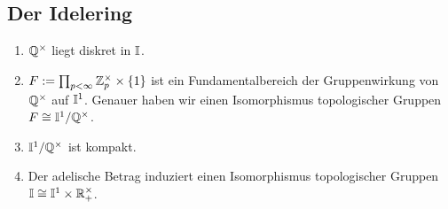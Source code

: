 \subsection{Der Idelering}
		\begin{satz}
			\begin{enumerate}[label=\emph{(\alph*)}]
				\item $\mathbb{Q}^\times$ liegt diskret in $\mathbb{I}$.
				\item $F:=\prod_{p<\infty}\mathbb{Z}_p^\times \times \{1\}$ ist ein Fundamentalbereich der Gruppenwirkung von $\mathbb{Q}^\times$ auf $\mathbb{I}^1$. Genauer haben wir einen Isomorphismus topologischer Gruppen $F \cong \mathbb{I}^1/\mathbb{Q}^\times$.
				\item $\mathbb{I}^1/\mathbb{Q}^\times$ ist kompakt.
				\item Der adelische Betrag induziert einen Isomorphismus topologischer Gruppen $\mathbb{I} \cong \mathbb{I}^1 \times \mathbb{R}^\times_+$.
			\end{enumerate}
		\end{satz}
	